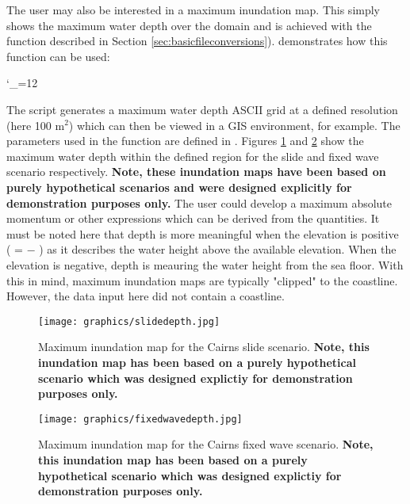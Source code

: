 \documentclass{manual}
\newcommand{\verbatiminputB}[1]{%
\endgroup}
\def\verbatiminputunderscore{\begingroup
\catcode`\_=12
\verbatiminputB}
\begin{document}
The user may also be interested in a maximum inundation map. This simply shows the
maximum water depth over the domain and is achieved with the function 
described in Section \ref{sec:basicfileconversions}).
 demonstrates how this function can be used:

\verbatiminputunderscore{../../anuga_core/examples/cairns/ExportResults.py}

The script generates a maximum water depth ASCII grid at a defined
resolution (here 100 m$^2$) which can then be viewed in a GIS environment, for
example. The parameters used in the function are defined in .
Figures \ref{fig:maxdepthcairnsslide} and \ref{fig:maxdepthcairnsfixedwave} show
the maximum water depth within the defined region for the slide and fixed wave scenario
respectively. {\bf Note, these inundation maps have been based on purely hypothetical
scenarios and were designed explicitly for demonstration purposes only.}
The user could develop a maximum absolute momentum or other expressions which can be
derived from the quantities.
It must be noted here that depth is more meaningful when the elevation is positive
( =  $-$ ) as it describes the water height
above the available elevation. When the elevation is negative, depth is meauring the
water height from the sea floor. With this in mind, maximum inundation maps are
typically "clipped" to the coastline. However, the data input here did not contain a
coastline.

\clearpage

\begin{figure}[htp]
  \centerline{\texttt{[image: graphics/slidedepth.jpg]}}
  \caption{Maximum inundation map for the Cairns slide scenario. \bf Note, this
           inundation map has been based on a purely hypothetical scenario which was
           designed explictiy for demonstration purposes only.}
  \label{fig:maxdepthcairnsslide}
\end{figure}

\clearpage

\begin{figure}[htp]
  \centerline{\texttt{[image: graphics/fixedwavedepth.jpg]}}
  \caption{Maximum inundation map for the Cairns fixed wave scenario.
           \bf Note, this inundation map has been based on a purely hypothetical scenario which was
           designed explictiy for demonstration purposes only.}
  \label{fig:maxdepthcairnsfixedwave}
\end{figure}
\end{document}

